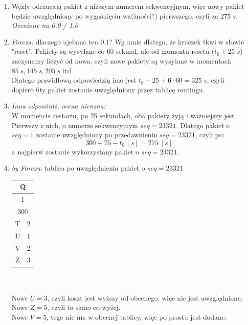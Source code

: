 			\begin{enumerate}
				\item Węzły odrzucają pakiet z niższym numerem sekwencyjnym, więc nowy pakiet będzie uwzględniony po wygaśnięciu wa(żności?) pierwszego, czyli za $ 275\;s $.\\
				\small{ \emph{Ocenione na 0.9 / 1.0}}
				\item \small{ \emph{Forczu:}} dlaczego ujebano ten 0.1? Wg mnie dlatego, że kruczek tkwi w słowie "reset". Pakiety są wysyłane co 60 sekund, ale od momentu resetu ($ t_0+25\;s $) zaczynamy liczyć od nowa, czyli nowe pakiety są wysyłane w momentach $ 85\;s, 145\;s, 205\;s $ itd.\\
				Dlatego prawidłową odpowiedzią imo jest $ t_0+25+\textbf{6}\cdot{60}=325\;s $, czyli dopiero 6ty pakiet zostanie uwzględniony przez tablicę routingu.
				\item \small{ \emph{Inna odpowiedź, ocena nienzna:}}\\
				W momencie restartu, po 25 sekundach, oba pakiety żyją i ważniejszy jest Pierwszy z nich, o numerze sekwencyjnym $ seq=23321 $. Dlatego pakiet o $ seq=1 $ zostanie uwzględniony po przedawnieniu $ seq=23321 $, czyli po:
				$$ 300 - 25 - t_0\;[s]= 275\;[s] $$
				a najpierw zostanie wykorzystany pakiet o $ seq=23321 $.
				\item \emph{by Forczu}: tablica po uwzględnieniu pakiet o $ seq=23321 $ \\
					\begin{tabular}{|c|c|}
						\hline \multicolumn{2}{|c|}{Q}  \\ 
						\hline \multicolumn{2}{|c|}{1}  \\ 
						\hline \multicolumn{2}{|c|}{300}  \\ 
						\hline T & 2 \\ 
						\hline U & 1 \\
						\hline V & 2 \\
						\hline Z & 3 \\ 
						\hline 
					\end{tabular}\\\\
				Nowe $ U=3 $, czyli koszt jest wyższy od obecnego, więc nie jest uwzględnione.\\
				Nowe $ Z=5 $, czyli to samo co wyżej.\\
				Nowe $ V=5 $, tego nie ma w obecnej tablicy, więc po prostu jest dodane.
		\end{enumerate}
